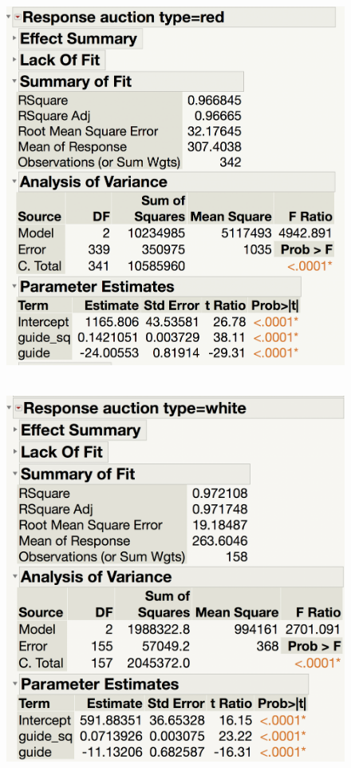 \documentclass[addpoints]{examsetup}
\begin{document}
\begin{questions}
\begin{parts}
      \begin{figure}
  \begin{minipage}[b]{.5\linewidth}
     \centering
    		\includegraphics[scale=.2]{figure/red-wine-quadratic.png}
  \end{minipage}%
  \begin{minipage}[b]{.5\linewidth}
     \centering\
    	  \includegraphics[scale=.2]{figure/white-wine-quadratic.png}

\end{minipage}
\end{figure}
\end{parts}
\end{questions}
\end{document}
